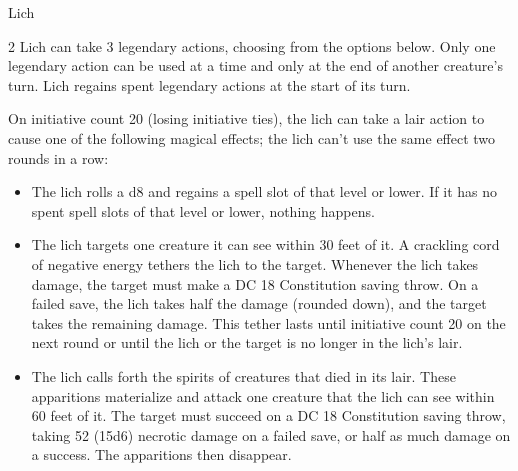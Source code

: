 \documentclass[10pt,a4paper,twoside,bg=print,twocolumn,openany,nodeprecatedcode]{dndbook}
\begin{document}
\begin{DndMonster}[float*=b,width=\textwidth + 8pt]{Lich}
\begin{multicols}{2}
Lich can take 3 legendary actions, choosing from the options below. Only one legendary action can be used at a time and only at the end of another creature's turn. Lich regains spent legendary actions at the start of its turn.

\begin{DndMonsterLegendaryActions}
\end{DndMonsterLegendaryActions}
On initiative count 20 (losing initiative ties), the lich can take a lair action to cause one of the following magical effects; the lich can't use the same effect two rounds in a row:


\begin{itemize}
\item The lich rolls a d8 and regains a spell slot of that level or lower. If it has no spent spell slots of that level or lower, nothing happens.
\item The lich targets one creature it can see within 30 feet of it. A crackling cord of negative energy tethers the lich to the target. Whenever the lich takes damage, the target must make a DC 18 Constitution saving throw. On a failed save, the lich takes half the damage (rounded down), and the target takes the remaining damage. This tether lasts until initiative count 20 on the next round or until the lich or the target is no longer in the lich's lair.
\item The lich calls forth the spirits of creatures that died in its lair. These apparitions materialize and attack one creature that the lich can see within 60 feet of it. The target must succeed on a DC 18 Constitution saving throw, taking 52 (15d6) necrotic damage on a failed save, or half as much damage on a success. The apparitions then disappear.
\end{itemize}

\end{multicols}
\end{DndMonster}
\end{document}

